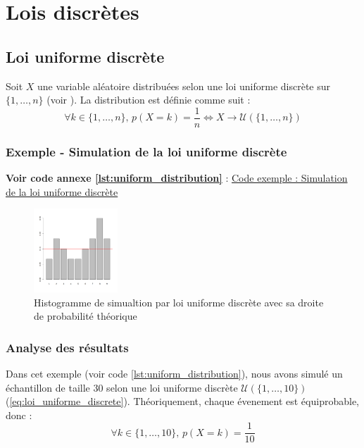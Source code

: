 \section{Lois discrètes}

  \subsection{Loi uniforme discrète}
    Soit $X$ une variable aléatoire distribuées selon une loi uniforme discrète sur $\{1,\ldots,n\}$ (voir \cite{uniformlaw}). La distribution est définie comme suit : 
    \begin{equation}
      \forall k\in \{1,\ldots,n\}, \, p(X=k)=\frac 1n \Leftrightarrow X \rightarrow \mathcal U(\{1,\ldots,n\})
      \label{eq:loi_uniforme_discrete}
    \end{equation}


\subsubsection{Exemple - Simulation de la loi uniforme discrète}

  \textbf{Voir code annexe \ref{lst:uniform_distribution}} : \hyperlink{\ref{lst:uniform_distribution}}{Code exemple : Simulation de la loi uniforme discrète}

  \begin{figure}[H]
    \centering
    \includegraphics[width=0.28\textwidth]{4_attachments/figures/output3.png}
    \caption{Histogramme de simualtion par loi uniforme discrète avec sa droite de probabilité théorique}
    \label{fig:histogramme_ech}
  \end{figure}

\subsubsection{Analyse des résultats}
  Dans cet exemple (voir code \ref{lst:uniform_distribution}), nous avons simulé un échantillon de taille $30$ selon une loi uniforme discrète $\mathcal{U}(\{1,\ldots,10\})$ (\ref{eq:loi_uniforme_discrete}). Théoriquement, chaque évenement est équiprobable, donc :
  \[
    \forall k\in \{1,\ldots,10\}, \, p(X=k)=\frac 1{10}
  \]

